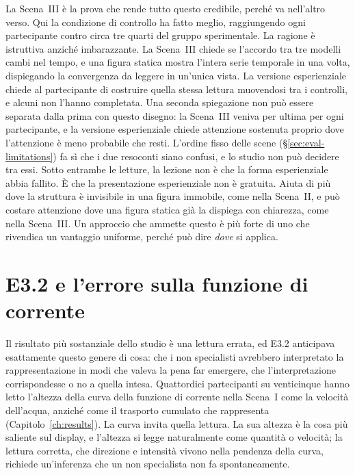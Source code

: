 La Scena~III è la prova che rende tutto questo credibile, perché va nell'altro verso. Qui la condizione di controllo ha fatto meglio, raggiungendo ogni partecipante contro circa tre quarti del gruppo sperimentale. La ragione è istruttiva anziché imbarazzante. La Scena~III chiede se l'accordo tra tre modelli cambi nel tempo, e una figura statica mostra l'intera serie temporale in una volta, dispiegando la convergenza da leggere in un'unica vista. La versione esperienziale chiede al partecipante di costruire quella stessa lettura muovendosi tra i controlli, e alcuni non l'hanno completata. Una seconda spiegazione non può essere separata dalla prima con questo disegno: la Scena~III veniva per ultima per ogni partecipante, e la versione esperienziale chiede attenzione sostenuta proprio dove l'attenzione è meno probabile che resti. L'ordine fisso delle scene (\S\ref{sec:eval-limitations}) fa sì che i due resoconti siano confusi, e lo studio non può decidere tra essi. Sotto entrambe le letture, la lezione non è che la forma esperienziale abbia fallito. È che la presentazione esperienziale non è gratuita. Aiuta di più dove la struttura è invisibile in una figura immobile, come nella Scena~II, e può costare attenzione dove una figura statica già la dispiega con chiarezza, come nella Scena~III. Un approccio che ammette questo è più forte di uno che rivendica un vantaggio uniforme, perché può dire \emph{dove} si applica.

\section{E3.2 e l'errore sulla funzione di corrente}
\label{sec:disc-e32}

Il risultato più sostanziale dello studio è una lettura errata, ed E3.2 anticipava esattamente questo genere di cosa: che i non specialisti avrebbero interpretato la rappresentazione in modi che valeva la pena far emergere, che l'interpretazione corrispondesse o no a quella intesa. Quattordici partecipanti su venticinque hanno letto l'altezza della curva della funzione di corrente nella Scena~I come la velocità dell'acqua, anziché come il trasporto cumulato che rappresenta (Capitolo~\ref{ch:results}). La curva invita quella lettura. La sua altezza è la cosa più saliente sul display, e l'altezza si legge naturalmente come quantità o velocità; la lettura corretta, che direzione e intensità vivono nella pendenza della curva, richiede un'inferenza che un non specialista non fa spontaneamente.

